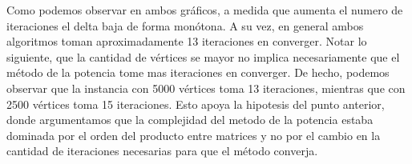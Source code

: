 Como podemos observar en ambos gráficos, a medida que aumenta el numero de iteraciones el delta baja de forma monótona. A su vez, en general ambos algoritmos toman aproximadamente 13 iteraciones en converger. Notar lo siguiente, que la cantidad de vértices se mayor no implica necesariamente que el método de la potencia tome mas iteraciones en converger. De hecho, podemos observar que la instancia con 5000 vértices toma 13 iteraciones, mientras que con 2500 vértices toma 15 iteraciones. Esto apoya la hipotesis del punto anterior, donde argumentamos que la complejidad del metodo de la potencia estaba dominada por el orden del producto entre matrices y no por el cambio en la cantidad de iteraciones necesarias para que el método converja.